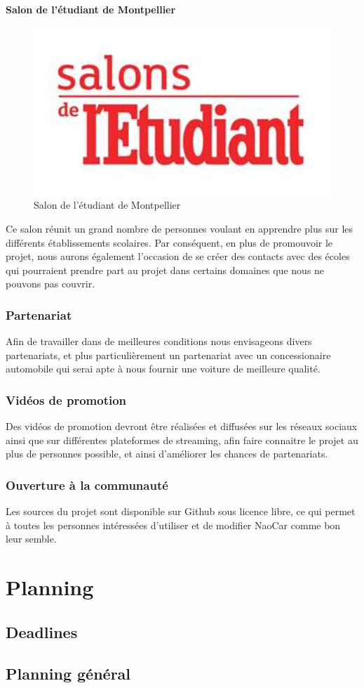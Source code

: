 \documentclass[11pt]{report} %
\begin{document}
	                \subsubsection{Salon de l'étudiant de Montpellier}
			        \begin{figure}[htb]
				\centering
				\includegraphics[width=1\textwidth]{salon-de-l-enseignement-superieur-de-montpellier.jpg}
				\caption{Salon de l'étudiant de Montpellier}
				\label{fig:Salon de l'étudiant de Montpellier}
				\end{figure}
				Ce salon réunit un grand nombre de personnes voulant en apprendre plus sur les différents établissements scolaires. Par conséquent, en plus de promouvoir le projet, nous aurons également l'occasion de se créer des contacts avec des écoles qui pourraient prendre part au projet dans certains domaines que nous ne pouvons pas couvrir.
		\subsection{Partenariat}
			Afin de travailler dans de meilleures conditions nous envisageons divers partenariats, et plus particulièrement un partenariat avec un concessionaire automobile qui serai apte à nous fournir une voiture de meilleure qualité.
		\subsection{Vidéos de promotion}
			Des vidéos de promotion devront être réalisées et diffusées sur les réseaux sociaux ainsi que sur différentes plateformes de streaming, afin faire connaitre le projet au plus de personnes possible, et ainsi d'améliorer les chances de partenariats.
		\subsection{Ouverture à la communauté}
			Les sources du projet sont disponible sur Github sous licence libre, ce qui permet à toutes les personnes intéressées d'utiliser et de modifier NaoCar comme bon leur semble.
\chapter{Planning}
	\section{Deadlines}
	\section{Planning général}
\end{document}
